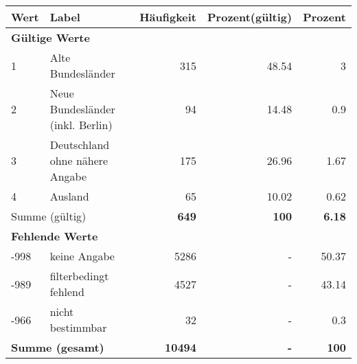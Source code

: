      \begin{longtable}{lXrrr}
     \toprule
     \textbf{Wert} & \textbf{Label} & \textbf{Häufigkeit} & \textbf{Prozent(gültig)} & \textbf{Prozent} \\
     \endhead
     \midrule
     \multicolumn{5}{l}{\textbf{Gültige Werte}}\\

     1 &
     \multicolumn{1}{X}{ Alte Bundesländer   } &


       \num{315} &
       \num[round-mode=places,round-precision=2]{48.54} &
         \num[round-mode=places,round-precision=2]{3} \\

     2 &
     \multicolumn{1}{X}{ Neue Bundesländer (inkl. Berlin)   } &


       \num{94} &
       \num[round-mode=places,round-precision=2]{14.48} &
         \num[round-mode=places,round-precision=2]{0.9} \\

     3 &
     \multicolumn{1}{X}{ Deutschland ohne nähere Angabe   } &


       \num{175} &
       \num[round-mode=places,round-precision=2]{26.96} &
         \num[round-mode=places,round-precision=2]{1.67} \\

     4 &
     \multicolumn{1}{X}{ Ausland   } &


       \num{65} &
       \num[round-mode=places,round-precision=2]{10.02} &
         \num[round-mode=places,round-precision=2]{0.62} \\
     \midrule
     \multicolumn{2}{l}{Summe (gültig)} &
       \textbf{\num{649}} &
     \textbf{\num{100}} &
       \textbf{\num[round-mode=places,round-precision=2]{6.18}} \\
     \multicolumn{5}{l}{\textbf{Fehlende Werte}}\\
       -998 &
       keine Angabe &
         \num{5286} &
        - &
         \num[round-mode=places,round-precision=2]{50.37} \\
       -989 &
       filterbedingt fehlend &
         \num{4527} &
        - &
         \num[round-mode=places,round-precision=2]{43.14} \\
       -966 &
       nicht bestimmbar &
         \num{32} &
        - &
         \num[round-mode=places,round-precision=2]{0.3} \\
     \midrule
     \multicolumn{2}{l}{\textbf{Summe (gesamt)}} &
          \textbf{\num{10494}} &
        \textbf{-} &
        \textbf{\num{100}} \\
     \bottomrule
     \end{longtable}
     
